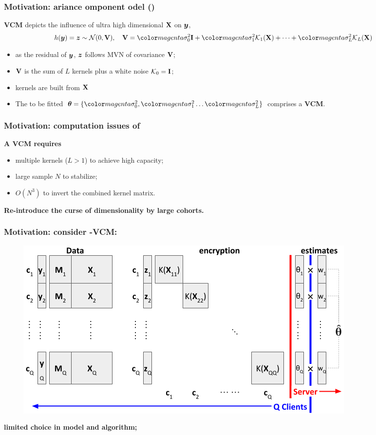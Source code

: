 \documentclass{beamer}
\begin{document}
\begin{frame}
  \frametitle{Motivation: ariance omponent
    odel ()} %
  \textbf{VCM} depicts the influence of ultra high dimensional $\mathbf{X}$
  on ${\bm{y}}$,
  \begin{align}\label{eq:vcm}
    h(\vy) = \vz \sim \mathcal{N}(0, \xv), \quad
    \xv = \fit{\sigma^2_0} \id + \fit{\sigma^2_1} \mck_1(\xx) + \dots + \fit{\sigma^2_L} \mck_L(\xx)
  \end{align}
  \begin{itemize}
  \item as the residual of ${\bm{y}}$, ${\bm{z}}$ follows MVN of covariance
    $\mathbf{V}$;
  \item $\mathbf{V}$ is the sum of $L$ kernels plus a white noise
    $\mathcal{K}_0 = \textbf{I}$;
  \item kernels are built from $\mathbf{X}$
  \item The to be fitted
    $\vtheta = \{\fit{\sigma^2_0}, \fit{\sigma^2_1} \dots
    \fit{\sigma^2_L}\}$ comprises a \textbf{VCM}.
  \end{itemize}

\end{frame}
\begin{frame}
  \frametitle{Motivation: computation issues of } %
  \textbf{A VCM requires}
  \begin{itemize}
  \item multiple kernels ($L>1$) to achieve high capacity;
  \item large sample $N$ to stabilize;
  \item $O(N^3)$ to invert the combined kernel matrix.
  \end{itemize}
  \textbf{Re-introduce the curse of dimensionality by large cohorts.}
\end{frame}
\begin{frame}\frametitle{Motivation: \textbf{consider
      -VCM:}} %
  \begin{figure}\includegraphics[width=.90\textwidth]{img/meta0}\end{figure}
  \textbf{}  \textbf{limited choice in model and
    algorithm;}
\end{frame}
\end{document}
